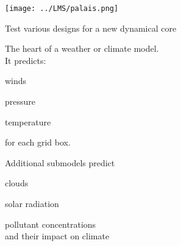 \begin{slide}

\hfill
\begin{minipage}{0.44\linewidth}
\hspace{-1in}
\texttt{[image: ../LMS/palais.png]}
\end{minipage}

\vspace{-6in}
\begin{minipage}{0.55\linewidth}
\begin{list0}
\item Test various designs for a new dynamical core
\end{list0}


\begin{list0}
\item The heart of a weather or climate model.\\
    It predicts:
    \begin{list1}
    \item winds
    \item pressure
    \item temperature
    \end{list1}
for each grid box. 
\item Additional submodels predict
    \begin{list1}
    \item clouds
    \item solar radiation
    \item pollutant concentrations \\
    and their impact on climate
    \end{list1}
\end{list0}
\end{minipage}
\end{slide}

